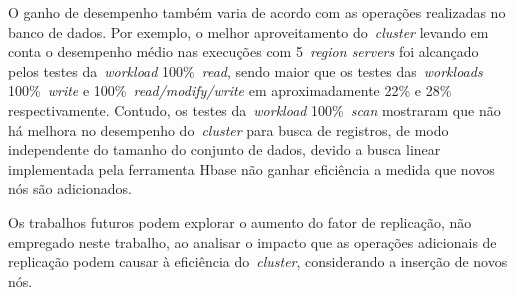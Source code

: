 \documentclass[12pt]{article}
\begin{document}

O ganho de desempenho também varia de acordo com as operações realizadas no banco de dados. Por exemplo, o melhor aproveitamento do~\emph{cluster}  levando em conta o desempenho médio nas execuções com 5~\emph{region servers} foi alcançado pelos testes da~\emph{workload} 100\%~\emph{read}, sendo maior que os testes das~\emph{workloads} 100\%~\emph{write} e 100\%~\emph{read/modify/write} em aproximadamente 22\% e 28\% respectivamente. Contudo, os testes da~\emph{workload} 100\%~\emph{scan} mostraram que não há melhora no desempenho do~\emph{cluster}  para busca de registros, de modo independente do tamanho do conjunto de dados, devido a busca linear implementada pela ferramenta Hbase não ganhar eficiência a medida que novos nós são adicionados. 

Os trabalhos futuros podem explorar o aumento do fator de replicação, não empregado neste trabalho, ao analisar o impacto que as operações adicionais de replicação podem causar à eficiência do~\emph{cluster}, considerando a inserção de novos nós.




\end{document}
